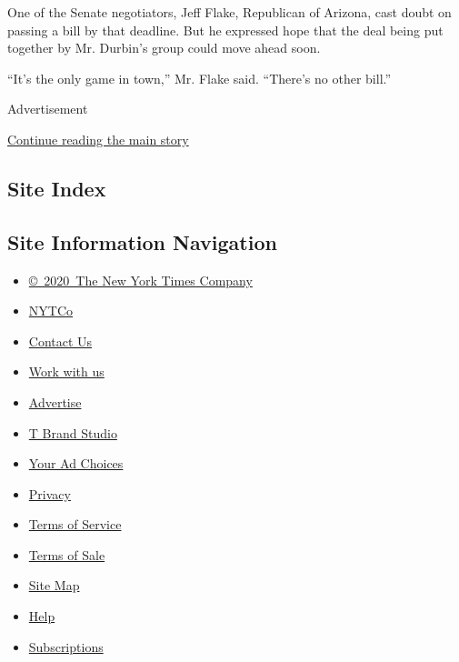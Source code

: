 One of the Senate negotiators, Jeff Flake, Republican of Arizona, cast
doubt on passing a bill by that deadline. But he expressed hope that the
deal being put together by Mr. Durbin's group could move ahead soon.

``It's the only game in town,'' Mr. Flake said. ``There's no other
bill.''

Advertisement

\protect\hyperlink{after-bottom}{Continue reading the main story}

\hypertarget{site-index}{%
\subsection{Site Index}\label{site-index}}

\hypertarget{site-information-navigation}{%
\subsection{Site Information
Navigation}\label{site-information-navigation}}

\begin{itemize}
\tightlist
\item
  \href{https://help.nytimes3xbfgragh.onion/hc/en-us/articles/115014792127-Copyright-notice}{©~2020~The
  New York Times Company}
\end{itemize}

\begin{itemize}
\tightlist
\item
  \href{https://www.nytco.com/}{NYTCo}
\item
  \href{https://help.nytimes3xbfgragh.onion/hc/en-us/articles/115015385887-Contact-Us}{Contact
  Us}
\item
  \href{https://www.nytco.com/careers/}{Work with us}
\item
  \href{https://nytmediakit.com/}{Advertise}
\item
  \href{http://www.tbrandstudio.com/}{T Brand Studio}
\item
  \href{https://www.nytimes3xbfgragh.onion/privacy/cookie-policy\#how-do-i-manage-trackers}{Your
  Ad Choices}
\item
  \href{https://www.nytimes3xbfgragh.onion/privacy}{Privacy}
\item
  \href{https://help.nytimes3xbfgragh.onion/hc/en-us/articles/115014893428-Terms-of-service}{Terms
  of Service}
\item
  \href{https://help.nytimes3xbfgragh.onion/hc/en-us/articles/115014893968-Terms-of-sale}{Terms
  of Sale}
\item
  \href{https://spiderbites.nytimes3xbfgragh.onion}{Site Map}
\item
  \href{https://help.nytimes3xbfgragh.onion/hc/en-us}{Help}
\item
  \href{https://www.nytimes3xbfgragh.onion/subscription?campaignId=37WXW}{Subscriptions}
\end{itemize}

